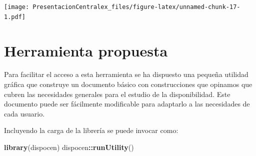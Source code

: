 \documentclass[
]{article}
\newenvironment{Shaded}{\begin{snugshade}}{\end{snugshade}}
\newcommand{\DataTypeTok}[1]{\textcolor[rgb]{0.13,0.29,0.53}{#1}}
\newcommand{\KeywordTok}[1]{\textcolor[rgb]{0.13,0.29,0.53}{\textbf{#1}}}
\newcommand{\NormalTok}[1]{#1}
\newcommand{\OperatorTok}[1]{\textcolor[rgb]{0.81,0.36,0.00}{\textbf{#1}}}
\newcommand{\StringTok}[1]{\textcolor[rgb]{0.31,0.60,0.02}{#1}}
\begin{document}
\begin{Shaded}
\end{Shaded}

\texttt{[image: PresentacionCentralex\_files/figure-latex/unnamed-chunk-17-1.pdf]}

\hypertarget{herramienta-propuesta}{%
\section{Herramienta propuesta}\label{herramienta-propuesta}}

Para facilitar el acceso a esta herramienta se ha dispuesto una pequeña
utilidad gráfica que construye un documento básico con construcciones
que opinamos que cubren las necesidades generales para el estudio de la
disponibilidad. Este documento puede ser fácilmente modificable para
adaptarlo a las necesidades de cada usuario.

Incluyendo la carga de la librería se puede invocar como:

\begin{Shaded}
\begin{Highlighting}[]
\KeywordTok{library}\NormalTok{(dispocen)}
\NormalTok{dispocen}\OperatorTok{::}\KeywordTok{runUtility}\NormalTok{()}
\end{Highlighting}
\end{Shaded}
\end{document}
